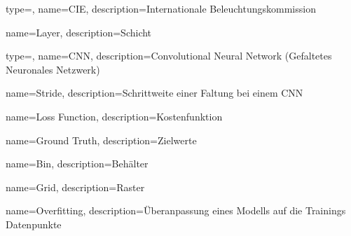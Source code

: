 {
	type=\acronymtype,
	name=CIE,
	description={Internationale Beleuchtungskommission}
}

{
	name=Layer,
	description={Schicht}
}

{
	type=\acronymtype,
	name=CNN,
	description={Convolutional Neural Network (Gefaltetes Neuronales Netzwerk)}
}

{
	name=Stride,
	description={Schrittweite einer Faltung bei einem \gls{CNN}}
}

{
	name=Loss Function,
	description={Kostenfunktion}
}

{
	name=Ground Truth,
	description={Zielwerte}
}

{
	name=Bin,
	description={Behälter}
}

{
	name=Grid,
	description={Raster}
}

{
	name=Overfitting,
	description={Überanpassung eines Modells auf die Trainings Datenpunkte}
}


